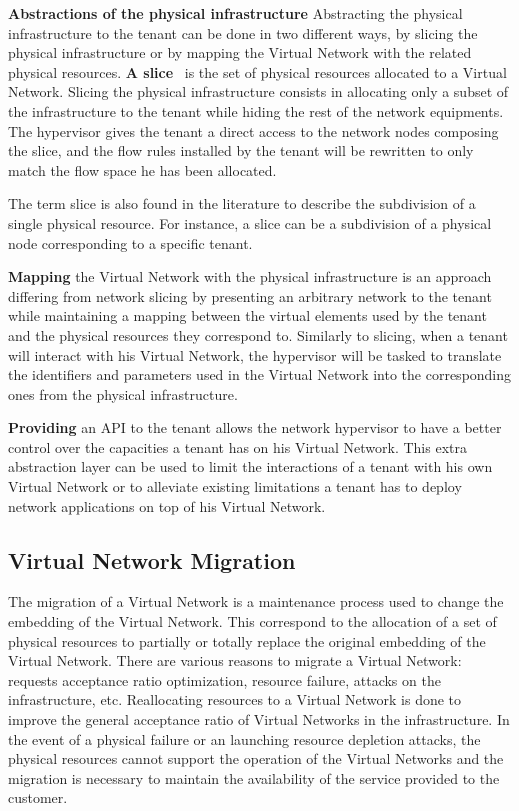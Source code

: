 \textbf{Abstractions of the physical infrastructure}
Abstracting the physical infrastructure to the tenant can be done in two different ways, by slicing the physical infrastructure or by mapping the Virtual Network with the related physical resources.
\textbf{A slice}~\cite{FlowVisor-Sherwood2009} is the set of physical resources allocated to a Virtual Network.
Slicing the physical infrastructure consists in allocating only a subset of the infrastructure to the tenant while hiding the rest of the network equipments.
The hypervisor gives the tenant a direct access to the network nodes composing the slice, and the flow rules installed by the tenant will be rewritten to only match the flow space he has been allocated.

The term slice is also found in the literature to describe the subdivision of a single physical resource. For instance, a slice can be a subdivision of a physical node corresponding to a specific tenant.

\textbf{Mapping} the Virtual Network with the physical infrastructure is an approach differing from network slicing by presenting an arbitrary network to the tenant while maintaining a mapping between the virtual elements used by the tenant and the physical resources they correspond to.
Similarly to slicing, when a tenant will interact with his Virtual Network, the hypervisor will be tasked to translate the identifiers and parameters used in the Virtual Network into the corresponding ones from the physical infrastructure.

\textbf{Providing} an API to the tenant allows the network hypervisor to have a better control over the capacities a tenant has on his Virtual Network. This extra abstraction layer can be used to limit the interactions of a tenant with his own Virtual Network or to alleviate existing limitations a tenant has to deploy network applications on top of his Virtual Network. 




\subsection{Virtual Network Migration}
The migration of a Virtual Network is a maintenance process used to change the embedding of the Virtual Network. 
This correspond to the allocation of a set of physical resources to partially or totally replace the original embedding of the Virtual Network.
There are various reasons to migrate a Virtual Network: requests acceptance ratio optimization, resource failure, attacks on the infrastructure, etc.
Reallocating resources to a Virtual Network is done to improve the general acceptance ratio of Virtual Networks in the infrastructure.
In the event of a physical failure or an launching resource depletion attacks, the physical resources cannot support the operation of the Virtual Networks and the migration is necessary to maintain the availability of the service provided to the customer.

